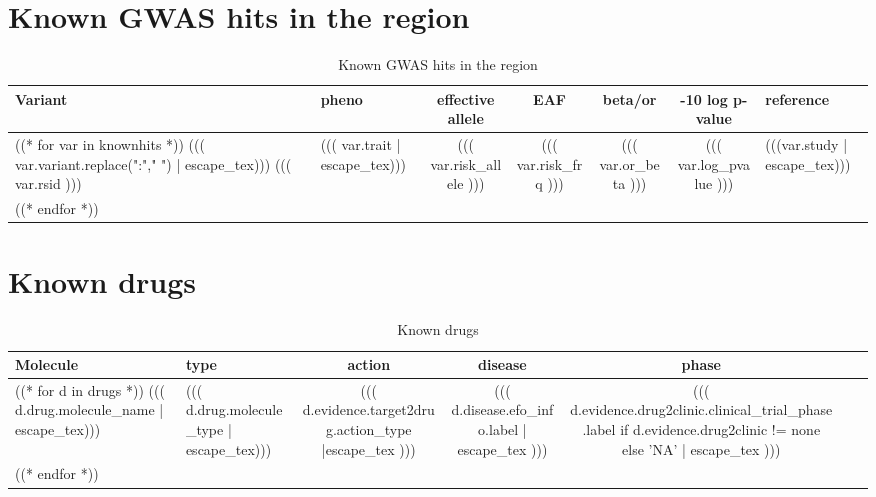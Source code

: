 \documentclass{article}
\begin{document}
\newpage

\section{ Known GWAS hits in the region}
\begin{longtable}{ >{\RaggedRight}p{3cm}|L{3cm}|c|c|c|c|>{\RaggedRight}p{3cm} }
\caption{ Known GWAS hits in the region }\\
Variant & pheno & effective allele & EAF & beta/or & -10 log p-value & reference \\
\hline
((* for var in knownhits *))
((( var.variant.replace(":"," ") | escape_tex))) \newline ((( var.rsid ))) & ((( var.trait | escape_tex))) & ((( var.risk_allele ))) & ((( var.risk_frq ))) & ((( var.or_beta ))) & ((( var.log_pvalue ))) & (((var.study | escape_tex))) \\
((* endfor *))
\end{longtable}



\newpage

\section{ Known drugs }
\begin{longtable}{ >{\RaggedRight}p{3cm}|L{3cm}|c|c|c|c|>{\RaggedRight}p{3cm} }
\caption{ Known drugs }\\
Molecule & type & action & disease & phase \\
\hline
((* for d in drugs *))
((( d.drug.molecule_name | escape_tex))) & ((( d.drug.molecule_type | escape_tex))) & ((( d.evidence.target2drug.action_type |escape_tex ))) & ((( d.disease.efo_info.label | escape_tex ))) & ((( d.evidence.drug2clinic.clinical_trial_phase.label if  d.evidence.drug2clinic != none else 'NA' | escape_tex ))) \\
((* endfor *))
\end{longtable}
\endgroup
\end{document}
